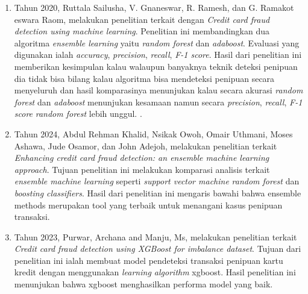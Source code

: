 \begin{enumerate}[noitemsep]
    \item Tahun 2020, Ruttala Sailusha, V. Gnaneswar, R. Ramesh, dan G. Ramakot eswara Raom, melakukan penelitian terkait dengan \textit{Credit card fraud detection using machine learning}. Penelitian ini membandingkan dua algoritma \textit{ensemble learning} yaitu \textit{random forest} dan \textit{adaboost}. Evaluasi yang digunakan ialah \textit{accuracy}, \textit{precision}, \textit{recall}, \textit{F-1 score}. Hasil dari penelitian ini memberikan kesimpulan kalau walaupun banyaknya teknik deteksi penipuan dia tidak bisa bilang kalau algoritma bisa mendeteksi penipuan secara menyeluruh dan hasil komparasinya menunjukan kalau secara akurasi \textit{random forest} dan \textit{adaboost} menunjukan kesamaan namun secara \textit{precision}, \textit{recall}, \textit{F-1 score} \textit{random forest} lebih unggul. \cite{9121114}.
    \item Tahun 2024, Abdul Rehman Khalid, Nsikak Owoh, Omair Uthmani, Moses Ashawa, Jude Osamor, dan John Adejoh, melakukan penelitian terkait \textit{Enhancing credit card fraud detection: an ensemble machine learning approach}. Tujuan penelitian ini melakukan komparasi analisis terkait \textit{ensemble machine learning} seperti \textit{support vector machine} \textit{random forest} dan \textit{boosting classifiers}. Hasil dari penelitian ini mengaris bawahi bahwa ensemble methods merupakan tool yang terbaik untuk menangani kasus penipuan transaksi. \cite{khalid2024enhancing}
    \item Tahun 2023, Purwar, Archana and Manju, Ms, melakukan penelitian terkait \textit{Credit card fraud detection using XGBoost for imbalance dataset}. Tujuan dari penelitian ini ialah membuat model pendeteksi transaksi penipuan kartu kredit dengan menggunakan \textit{learning algorithm} xgboost. Hasil penelitian ini menunjukan bahwa xgboost menghasilkan performa model yang baik. \cite{purwar2023credit}
\end{enumerate}


